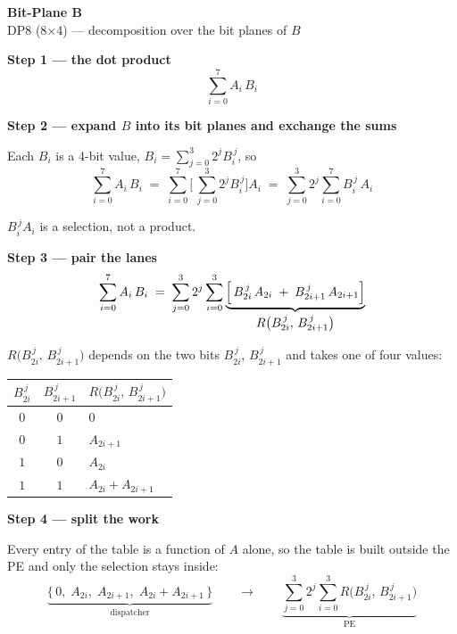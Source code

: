 \documentclass[fleqn]{article}
\newcommand{\Rf}{R\bigl(B_{2i}^{\,j},\, B_{2i+1}^{\,j}\bigr)}
\begin{document}
\begin{center}
{\LARGE \textbf{Bit-Plane B}}\\[4pt]
{\large DP8 (8$\times$4) --- decomposition over the bit planes of $B$}
\end{center}

\vspace{3em}

\noindent\textbf{Step 1 --- the dot product}
\[
\sum_{i=0}^{7} A_i \, B_i
\]

\vspace{0.5em}

\noindent\textbf{Step 2 --- expand $B$ into its bit planes and exchange the sums}

\noindent Each $B_i$ is a 4-bit value, $B_i = \sum_{j=0}^{3} 2^{j} B_i^{\,j}$, so
\[
\sum_{i=0}^{7} A_i \, B_i
  \;=\; \sum_{i=0}^{7} \Biggl[\, \sum_{j=0}^{3} 2^{j} B_i^{\,j} \Biggr] A_i
  \;=\; \sum_{j=0}^{3} 2^{j} \sum_{i=0}^{7} B_i^{\,j} \, A_i
\]

\noindent $B_i^{\,j} A_i$ is a selection, not a product.

\vspace{0.5em}

\noindent\textbf{Step 3 --- pair the lanes}
\[
\sum_{i=0}^{7} A_i \, B_i
  \;=\; \sum_{j=0}^{3} 2^{j} \sum_{i=0}^{3}
        \underbrace{\Bigl[\, B_{2i}^{\,j} \, A_{2i} \;+\; B_{2i+1}^{\,j} \, A_{2i+1} \Bigr]}_{\textstyle \Rf}
\]

\noindent $\Rf$ depends on the two bits $B_{2i}^{\,j}$, $B_{2i+1}^{\,j}$ and takes one of
four values:

\vspace{1em}

\begin{center}
\renewcommand{\arraystretch}{1.35}
\begin{tabular}{c c | l}
$B_{2i}^{\,j}$ & $B_{2i+1}^{\,j}$ & \multicolumn{1}{c}{$\Rf$} \\
\hline
$0$ & $0$ & $0$ \\
$0$ & $1$ & $A_{2i+1}$ \\
$1$ & $0$ & $A_{2i}$ \\
$1$ & $1$ & $A_{2i} + A_{2i+1}$ \\
\end{tabular}
\end{center}

\vspace{1.5em}

\noindent\textbf{Step 4 --- split the work}

\noindent Every entry of the table is a function of $A$ alone, so the table is built
outside the PE and only the selection stays inside:
\[
\underbrace{\bigl\{\, 0,\; A_{2i},\; A_{2i+1},\; A_{2i} + A_{2i+1} \,\bigr\}}_{\textstyle \text{dispatcher}}
\qquad\longrightarrow\qquad
\underbrace{\sum_{j=0}^{3} 2^{j} \sum_{i=0}^{3} \Rf}_{\textstyle \text{PE}}
\]
\end{document}
